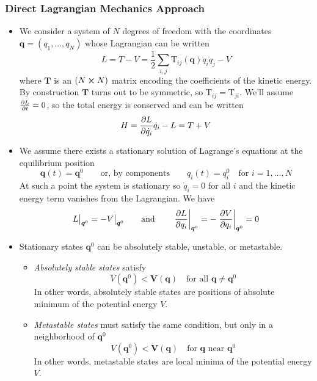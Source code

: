 \documentclass[11pt, a4paper]{article}
\newcommand{\eqtext}[1]{\qquad \text{#1} \qquad}
\newcommand{\mat}[1]{\mathbf{#1}}
\begin{document}
\subsubsection{Direct Lagrangian Mechanics Approach}
\begin{itemize}
	\item We consider a system of $ N $ degrees of freedom with the coordinates $ \bm{q} = (q_{1}, \ldots, q_{N}) $ whose Lagrangian can be written
	\begin{equation*}
		L = T - V = \frac{1}{2} \sum_{i,j}\mathrm{T}_{ij}(\bm{q})\dot{q}_{i}\dot{q}_{j} - V
	\end{equation*}
	where $ \mat{T} $ is an $ (N \cross N) $ matrix encoding the coefficients of the kinetic energy. By construction $ \mat{T} $ turns out to be symmetric, so $ \mathrm{T}_{ij} = \mathrm{T}_{ji} $. We'll assume $ \pdv{L}{t} = 0$, so the total energy is conserved and can be written
	\begin{equation*}
		H = \pdv{L}{\dot{q}_{i}} \dot{q}_{i} - L = T + V
	\end{equation*}
	
	\item We assume there exists a stationary solution of Lagrange's equations at the equilibrium position 
	\begin{equation*}
		\bm{q}(t) = \bm{q}^{0} \eqtext{or, by components} q_{i}(t) = q_{i}^{0} \quad \text{for } i = 1, \ldots, N
	\end{equation*}
	At such a point the system is stationary so $ \dot{q}_{i} = 0 $ for all $ i $ and the kinetic energy term vanishes from the Lagrangian. We have
	\begin{equation*}
		L \big |_{\bm{q}^{0}} = - V \big |_{\bm{q}^{0}} \eqtext{and} \eval{\pdv{L}{q_{i}}}_{\bm{q}^{0}} =  - \eval{\pdv{V}{q_{i}}}_{\bm{q}^{0}} = 0
	\end{equation*}

	\item Stationary states $ \bm{q}^{0} $ can be absolutely stable, unstable, or metastable. 
	\begin{itemize}
		\item \textit{Absolutely stable states} satisfy
			\begin{equation*}
				V(\bm{q}^{0}) < \bm{V}(\bm{q}) \quad \text{for all } \bm{q} \neq \bm{q}^{0}
			\end{equation*}
			In other words, absolutely stable states are positions of absolute minimum of the potential energy $ V $. 
			
		\item \textit{Metastable states} must satisfy the same condition, but only in a neighborhood of $ \bm{q}^{0} $
		\begin{equation*}
			V(\bm{q}^{0}) < \bm{V}(\bm{q}) \quad \text{for } \bm{q} \text{ near } \bm{q}^{0}
		\end{equation*}
		In other words, metastable states are local minima of the potential energy $ V $. 
		

\end{itemize}
\end{itemize}
\end{document}
